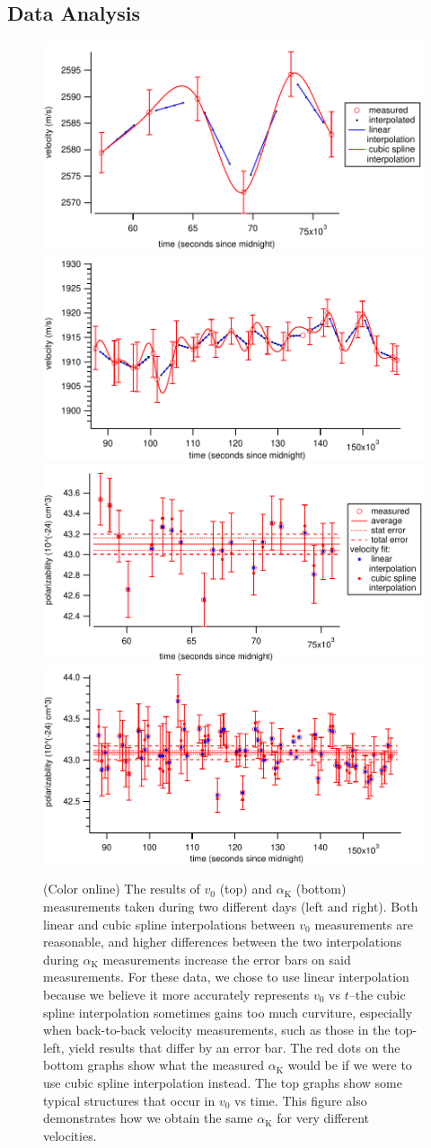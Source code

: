 \documentclass[twocolumn, prl,showpacs,superscriptaddress]{revtex4-1}   %
\newcommand{\ak}{\alpha_{\textrm{K}}}
\begin{document}
\subsection{Data Analysis}

\begin{figure}
\includegraphics[width=0.49\linewidth,keepaspectratio]{velVsTime_150212.pdf}
\includegraphics[width=0.49\linewidth,keepaspectratio]{velVsTime_150413.pdf}
\includegraphics[width=0.49\linewidth,keepaspectratio]{polVsTime_150212.pdf}
\includegraphics[width=0.49\linewidth,keepaspectratio]{polVsTime_150413.pdf}
\caption{\label{velPolVsTimeExample}(Color online) The results of $v_0$ (top) and $\ak$ (bottom) measurements taken during two different days (left and right). Both linear and cubic spline interpolations between $v_0$ measurements are reasonable, and higher differences between the two interpolations during $\ak$ measurements increase the error bars on said measurements. For these data, we chose to use linear interpolation because we believe it more accurately represents $v_0$ vs $t$--the cubic spline interpolation sometimes gains too much curviture, especially when back-to-back velocity measurements, such as those in the top-left, yield results that differ by an error bar. The red dots on the bottom graphs show what the measured $\ak$ would be if we were to use cubic spline interpolation instead. The top graphs show some typical structures that occur in $v_0$ vs time. This figure also demonstrates how we obtain the same $\ak$ for very different velocities.}
\end{figure}
\end{document}

